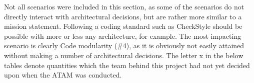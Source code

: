Not all scenarios were included in this section, as some of the scenarios do not directly interact with
architectural decisions, but are rather more similar to a mission statement.
Following a coding standard such as CheckStyle should be possible with more or less
any architecture, for example. The most impacting scenario is clearly Code modularity (\#4), as
it is obviously not easily attained without making a number of architectural decisions. The letter
x in the below tables denote quantities which the team behind this project had not yet decided
upon when the ATAM was conducted.
\begin{table}[H]
\end{table}
